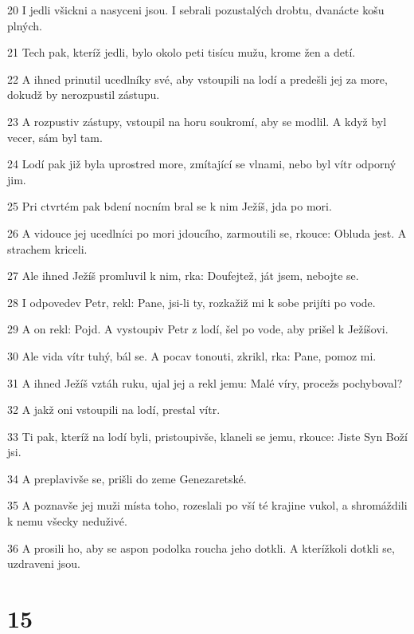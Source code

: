 \par 20 I jedli všickni a nasyceni jsou. I sebrali pozustalých drobtu, dvanácte košu plných.
\par 21 Tech pak, kteríž jedli, bylo okolo peti tisícu mužu, krome žen a detí.
\par 22 A ihned prinutil ucedlníky své, aby vstoupili na lodí a predešli jej za more, dokudž by nerozpustil zástupu.
\par 23 A rozpustiv zástupy, vstoupil na horu soukromí, aby se modlil. A když byl vecer, sám byl tam.
\par 24 Lodí pak již byla uprostred more, zmítající se vlnami, nebo byl vítr odporný jim.
\par 25 Pri ctvrtém pak bdení nocním bral se k nim Ježíš, jda po mori.
\par 26 A vidouce jej ucedlníci po mori jdoucího, zarmoutili se, rkouce: Obluda jest. A strachem kriceli.
\par 27 Ale ihned Ježíš promluvil k nim, rka: Doufejtež, ját jsem, nebojte se.
\par 28 I odpovedev Petr, rekl: Pane, jsi-li ty, rozkažiž mi k sobe prijíti po vode.
\par 29 A on rekl: Pojd. A vystoupiv Petr z lodí, šel po vode, aby prišel k Ježíšovi.
\par 30 Ale vida vítr tuhý, bál se. A pocav tonouti, zkrikl, rka: Pane, pomoz mi.
\par 31 A ihned Ježíš vztáh ruku, ujal jej a rekl jemu: Malé víry, procežs pochyboval?
\par 32 A jakž oni vstoupili na lodí, prestal vítr.
\par 33 Ti pak, kteríž na lodí byli, pristoupivše, klaneli se jemu, rkouce: Jiste Syn Boží jsi.
\par 34 A preplavivše se, prišli do zeme Genezaretské.
\par 35 A poznavše jej muži místa toho, rozeslali po vší té krajine vukol, a shromáždili k nemu všecky neduživé.
\par 36 A prosili ho, aby se aspon podolka roucha jeho dotkli. A kterížkoli dotkli se, uzdraveni jsou.

\chapter{15}

